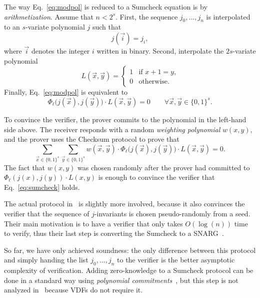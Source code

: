 \documentclass{llncs}
\begin{document}
The way Eq.~\eqref{eq:modpol} is reduced to a Sumcheck equation is by \emph{arithmetization}.
Assume that $n < 2^s$.
First, the sequence $j_0,\ldots,j_n$ is interpolated to an $s$-variate polynomial $j$ such that
\begin{equation}
    j(\vec{i}) = j_i,
\end{equation}
where $\vec{i}$ denotes the integer $i$ written in binary.
Second, interpolate the $2s$-variate polynomial
\begin{equation}
    L(\vec{x}, \vec{y}) = \begin{cases}
    1 &\text{if $x + 1= y$,}\\
    0 &\text{otherwise.}
    \end{cases}
\end{equation}
Finally, Eq.~\eqref{eq:modpol} is equivalent to
\begin{equation}
    \label{eq:sumcheck}
    \Phi_\ell\bigl(j(\vec{x}), j(\vec{y})\bigr) \cdot L(\vec{x}, \vec{y}) = 0
    \qquad
    \forall \vec{x}, \vec{y} \in \{0,1\}^s.
\end{equation}

To convince the verifier, the prover commits to the polynomial in the left-hand side above.
The receiver responds with a random \emph{weighting polynomial} $w(x,y)$, and the prover uses the Checksum protocol to prove that
\begin{equation}
    \sum_{\vec{x}\in\{0,1\}^s} \sum_{\vec{y}\in\{0,1\}^s}
    w(\vec{x}, \vec{y}) \cdot \Phi_\ell\bigl(j(\vec{x}), j(\vec{y})\bigr) \cdot L(\vec{x}, \vec{y}) = 0.
\end{equation}
The fact that $w(x,y)$ was chosen randomly after the prover had committed to $\Phi_\ell(j(x),j(y)) \cdot L(x,y)$ is enough to convince the verifier that Eq.~\eqref{eq:sumcheck} holds.

The actual protocol in~\cite{10.1007/978-3-030-99277-4_21} is slightly more involved, because it also convinces the verifier that the sequence of $j$-invariants is chosen pseudo-randomly from a seed.
Their main motivation is to have a verifier that only takes $O(\log(n))$ time to verify, thus their last step is converting the Sumcheck to a SNARG~\cite{10.1137/S0097539795284959}.

So far, we have only achieved soundness: the only difference between this protocol and simply handing the list $j_0,\ldots,j_n$ to the verifier is the better asymptotic complexity of verification.
Adding zero-knowledge to a Sumcheck protocol can be done in a standard way using \emph{polynomial commitments}~\cite{10.1007/978-3-642-17373-8_11}, but this step is not analyzed
in~\cite{10.1007/978-3-030-99277-4_21} because VDFs do not require it.
\end{document}
